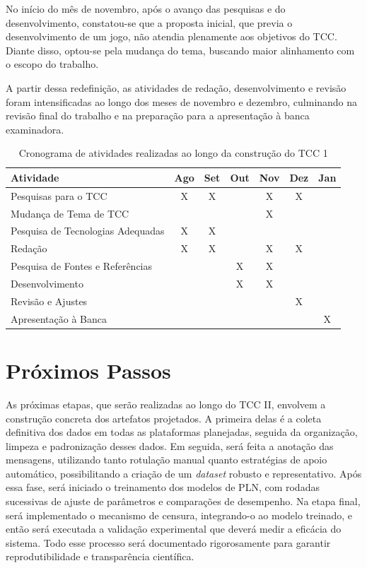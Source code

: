 \documentclass{eic-bcc-tcc}
\begin{document}
No início do mês de novembro, após o avanço das pesquisas e do desenvolvimento, constatou-se que a proposta inicial, que previa o desenvolvimento de um jogo, não atendia plenamente aos objetivos do TCC. Diante disso, optou-se pela mudança do tema, buscando maior alinhamento com o escopo do trabalho.

A partir dessa redefinição, as atividades de redação, desenvolvimento e revisão foram intensificadas ao longo dos meses de novembro e dezembro, culminando na revisão final do trabalho e na preparação para a apresentação à banca examinadora.

\begin{table}[h!]
\centering
\small
\setlength{\tabcolsep}{4pt}
\begin{tabular}{lcccccc}
\hline
\textbf{Atividade} & \textbf{Ago} & \textbf{Set} & \textbf{Out} & \textbf{Nov} & \textbf{Dez} & \textbf{Jan} \\ \hline
Pesquisas para o TCC              & X & X &   & X & X &   \\
Mudança de Tema de TCC            &   &   &   & X &   &   \\
Pesquisa de Tecnologias Adequadas & X & X &   &   &   &   \\
Redação                           & X & X &   & X & X &   \\
Pesquisa de Fontes e Referências  &   &   & X & X &   &   \\
Desenvolvimento                   &   &   & X & X &   &   \\
Revisão e Ajustes                 &   &   &   &   & X &   \\
Apresentação à Banca              &   &   &   &   &   & X \\ \hline
\end{tabular}
\caption{Cronograma de atividades realizadas ao longo da construção do TCC 1}
\end{table}


\section{Próximos Passos}

As próximas etapas, que serão realizadas ao longo do TCC II, envolvem a construção concreta dos artefatos projetados. A primeira delas é a coleta definitiva dos dados em todas as plataformas planejadas, seguida da organização, limpeza e padronização desses dados. Em seguida, será feita a anotação das mensagens, utilizando tanto rotulação manual quanto estratégias de apoio automático, possibilitando a criação de um \textit{dataset} robusto e representativo. Após essa fase, será iniciado o treinamento dos modelos de PLN, com rodadas sucessivas de ajuste de parâmetros e comparações de desempenho. Na etapa final, será implementado o mecanismo de censura, integrando-o ao modelo treinado, e então será executada a validação experimental que deverá medir a eficácia do sistema. Todo esse processo será documentado rigorosamente para garantir reprodutibilidade e transparência científica.
\end{document}
